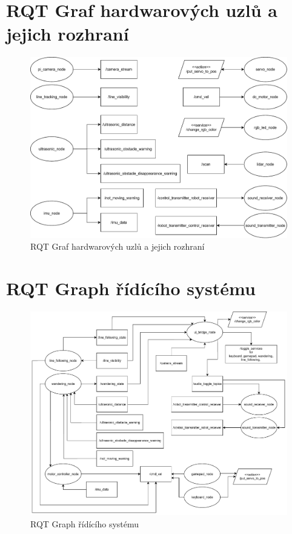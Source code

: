 
%

\chapter{RQT Graf hardwarových uzlů a jejich rozhraní}

\begin{figure}[h!]
	\centering
	\includegraphics[scale=0.65]{obrazky-figures/hardware_nodes.pdf}
	\caption{RQT Graf hardwarových uzlů a jejich rozhraní}
	\label{}
\end{figure}

\chapter{RQT Graph řídícího systému}

\begin{figure}[h!]
	\centering
	\includegraphics[scale=0.55]{obrazky-figures/controller_nodes.pdf}
	\caption{RQT Graph řídícího systému}
	\label{}
\end{figure}

%

